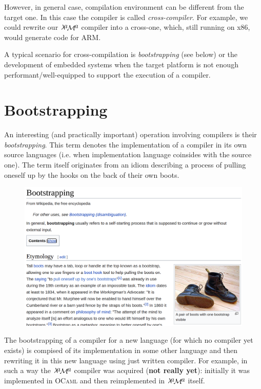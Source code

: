 \documentclass{book}
\newcommand{\lama}{$\lambda\kern -.1667em\lower -.5ex\hbox{$a$}\kern -.1000em\lower .2ex\hbox{$\mathcal M$}\kern -.1000em\lower -.5ex\hbox{$a$}$\xspace}
\newcommand{\lang}[1]{\textsc{#1}}
\begin{document}
However, in general case, compilation environment can be different from the target one. In this case the compiler is called
\emph{cross-compiler}. For example, we could rewrite our \lama compiler into a cross-one, which, still running on x86,
would generate code for ARM. 

A typical scenario for cross-compilation is \emph{bootstrapping} (see below) or the development of embedded systems when
the target platform is not enough performant/well-equipped to support the execution of a compiler.

\section{Bootstrapping}

An interesting (and practically important) operation involving compilers is their \emph{bootstrapping}. This term denotes the
implementation of a compiler in its own source languages (i.e. when implementation language coinsides with the source one).
The term itself originates from an idiom describing a process of pulling oneself up by the hooks on the back of their own
boots.

\begin{figure}[h]
  \centering
  \includegraphics[scale=0.2]{images/bootstrapping.png}
\end{figure}

The bootstrapping of a compiler for a new language (for which no compiler yet exists) is compised of its implementation
in some other language and then rewriting it in this new language using just written compiler. For example, in such a way the \lama compiler was
acquired (\textbf{not really yet}): initially it was implemented in \lang{OCaml} and then reimplemented in
\lama itself.
\end{document}
